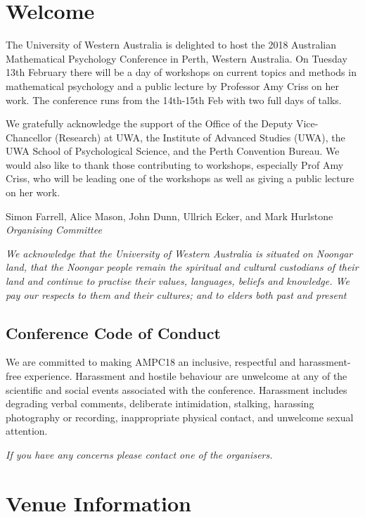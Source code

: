 \documentclass[]{article}
\begin{document}
\section{Welcome}\label{welcome}

The University of Western Australia is delighted to host the 2018
Australian Mathematical Psychology Conference in Perth, Western
Australia. On Tuesday 13th February there will be a day of workshops on
current topics and methods in mathematical psychology and a public
lecture by Professor Amy Criss on her work. The conference runs from the
14th-15th Feb with two full days of talks.

We gratefully acknowledge the support of the Office of the Deputy
Vice-Chancellor (Research) at UWA, the Institute of Advanced Studies
(UWA), the UWA School of Psychological Science, and the Perth Convention
Bureau. We would also like to thank those contributing to workshops,
especially Prof Amy Criss, who will be leading one of the workshops as
well as giving a public lecture on her work.

\vspace{0.5cm} Simon Farrell, Alice Mason, John Dunn, Ullrich Ecker, and
Mark Hurlstone\\
\emph{Organising Committee}

\emph{We acknowledge that the University of Western Australia is
situated on Noongar land, that the Noongar people remain the spiritual
and cultural custodians of their land and continue to practise their
values, languages, beliefs and knowledge. We pay our respects to them
and their cultures; and to elders both past and present }

\subsection{Conference Code of
Conduct}\label{conference-code-of-conduct}

We are committed to making AMPC18 an inclusive, respectful and
harassment-free experience. Harassment and hostile behaviour are
unwelcome at any of the scientific and social events associated with the
conference. Harassment includes degrading verbal comments, deliberate
intimidation, stalking, harassing photography or recording,
inappropriate physical contact, and unwelcome sexual attention.

\emph{If you have any concerns please contact one of the organisers.}

\newpage

\section{Venue Information}\label{venue-information}
\end{document}
